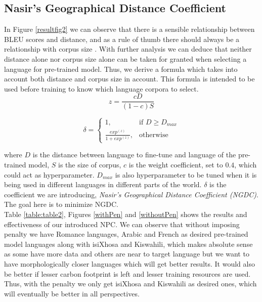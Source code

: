 \documentclass[11pt]{article}
\begin{document}
\subsection{Nasir's Geographical Distance Coefficient}

In Figure \ref{resultfig2} we can observe that there is a sensible relationship between BLEU scores and distance, and as a rule of thumb there should always be a relationship with corpus size \citep{lin2019choosing}. With further analysis we can deduce that neither distance alone nor corpus size alone can be taken for granted when selecting a language for pre-trained model. Thus, we derive a formula which takes into account both distance and corpus size in account. This formula is intended to be used before training to know which language corpora to select.
\\
\begin{equation*}
    z = \frac{cD}{(1-c)S}
\end{equation*}


\[
    \delta = 
\begin{cases}
    1 ,& \text{if } D\geq D_{max}\\
    \frac{exp^(z)}{1 + exp^(z)} ,  & \text{otherwise}
\end{cases}
\]

where $D$ is the distance between language to fine-tune and language of the pre-trained model, $S$ is the size of corpus, $c$ is the weight coefficient, set to $0.4$, which could act as hyperparameter. $D_{max}$ is also hyperparameter to be tuned when it is being used in different languages in different parts of the world. $\delta$ is the coefficient we are introducing, \emph{Nasir's Geographical Distance Coefficient (NGDC)}. The goal here is to minimize NGDC. \\



Table \ref{table:table2}, Figures \ref{withPen} and \ref{withoutPen} shows the results and effectiveness of our introduced NPC. We can observe that without imposing penalty we have Romance languages, Arabic and French as desired pre-trained model languages along with isiXhosa and Kiswahili, which makes absolute sense as some have more data and others are near to target language but we want to have morphologically closer languages which will get better results. It would also be better if lesser carbon footprint is left and lesser training resources are used. Thus, with the penalty we only get isiXhosa and Kiswahili as desired ones, which will eventually be better in all perspectives. 
\end{document}
